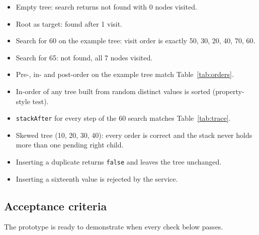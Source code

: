 \documentclass[11pt,a4paper]{article}
\newcommand{\code}[1]{\texttt{#1}}
\begin{document}
\begin{itemize}
  \item Empty tree: search returns not found with 0 nodes visited.
  \item Root as target: found after 1 visit.
  \item Search for 60 on the example tree: visit order is exactly 50, 30, 20, 40, 70, 60.
  \item Search for 65: not found, all 7 nodes visited.
  \item Pre-, in- and post-order on the example tree match Table~\ref{tab:orders}.
  \item In-order of any tree built from random distinct values is sorted (property-style test).
  \item \code{stackAfter} for every step of the 60 search matches Table~\ref{tab:trace}.
  \item Skewed tree (10, 20, 30, 40): every order is correct and the stack never holds more than one
        pending right child.
  \item Inserting a duplicate returns \code{false} and leaves the tree unchanged.
  \item Inserting a sixteenth value is rejected by the service.
\end{itemize}

\subsection{Acceptance criteria}

The prototype is ready to demonstrate when every check below passes.
\end{document}
